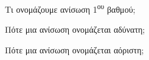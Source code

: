 \begin{alist}
\item Τι ονομάζουμε ανίσωση 1\textsuperscript{ου} βαθμού;
\item Πότε μια ανίσωση ονομάζεται αδύνατη;
\item Πότε μια ανίσωση ονομάζεται αόριστη;
\end{alist}
